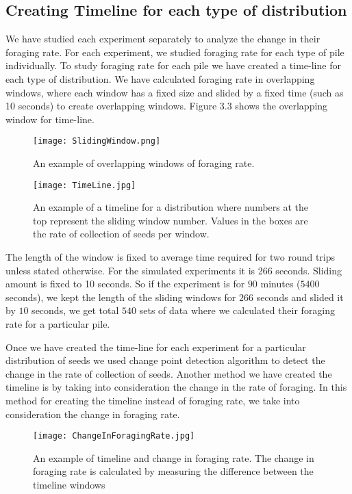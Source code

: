 \subsection{\label{Creating Timeline for each type of distribution}Creating Timeline for each type of distribution}
 We have studied each experiment separately to analyze the change in their foraging rate. For each experiment, we studied foraging rate for each type of pile individually. To study foraging rate for each pile we have created a time-line for each type of distribution. We have calculated foraging rate in overlapping windows, where each window has a fixed size and slided by a fixed time (such as 10 seconds) to create overlapping windows. Figure 3.3 shows the overlapping window for time-line. \par 
 \begin{figure}[h]
 	\texttt{[image: SlidingWindow.png]}
 	\caption{An example of overlapping windows of foraging rate.}
 \end{figure}
 \begin{figure}[h]
 	\texttt{[image: TimeLine.jpg]}
 	\caption{An example of a timeline for a distribution where numbers at the top represent the sliding window number. Values in the boxes are the rate of collection of seeds per window.}
 \end{figure}
The length of the window is fixed to average time required for two round trips unless stated otherwise. For the simulated experiments it is 266 seconds. Sliding amount is fixed to 10 seconds. So if the experiment is for $90$ minutes ($5400$ seconds), we kept the length of the sliding windows for $266$ seconds and slided it by $10$ seconds, we get total $540$ sets of data where we calculated their foraging rate for a particular pile.\par 
 Once we have created the time-line for each experiment for a particular distribution of seeds we used change point detection algorithm to detect the change in the rate of collection of seeds. Another method we have created the timeline is by taking into consideration the change in the rate of foraging. In this method for creating the timeline instead of foraging rate, we take into consideration the change in foraging rate.\par
 \begin{figure}[h]
 	\texttt{[image: ChangeInForagingRate.jpg]}
 	\caption{An example of timeline and change in foraging rate. The change in foraging rate is calculated by measuring the difference between the timeline windows}
 \end{figure}
